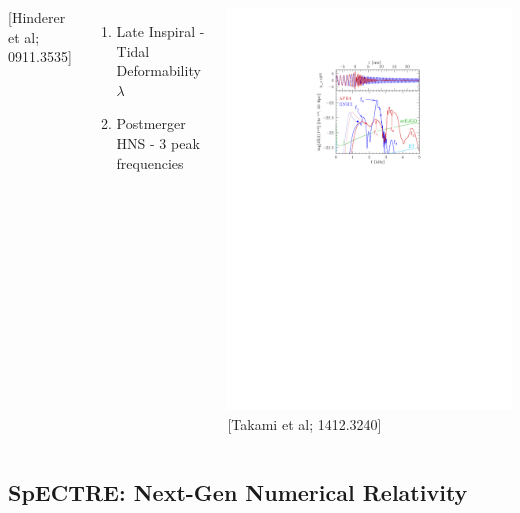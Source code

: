 \begin{frame}
\begin{columns}
\begin{minipage}[c][0.4\textheight][c]{\linewidth}
{\tiny [Hinderer et al; 0911.3535]}
\end{minipage}
\begin{minipage}[c][0.4\textheight][c]{\linewidth}
  \begin{enumerate}
  \item[\blacksquare]Late Inspiral - Tidal Deformability $\lambda$
  \item[\blacksquare]Postmerger HNS - 3 peak frequencies
  \end{enumerate}
\end{minipage}
\begin{minipage}[c][0.4\textheight][c]{\linewidth}
  \centering
  \includegraphics[width=.7\textwidth]{pictures/f3.pdf}\\
\vspace{-.2cm}
{\tiny [Takami et al; 1412.3240]}
\end{minipage}
\end{columns}
\end{frame}

\subsection{SpECTRE: Next-Gen Numerical Relativity}

